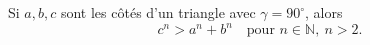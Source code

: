 Si $a, b, c$ sont les côtés d'un triangle avec $\gamma = 90^\circ$, alors
\[ c^n > a^n + b^n \quad\text{pour } n \in \mathbb{N},\ n > 2. \]
